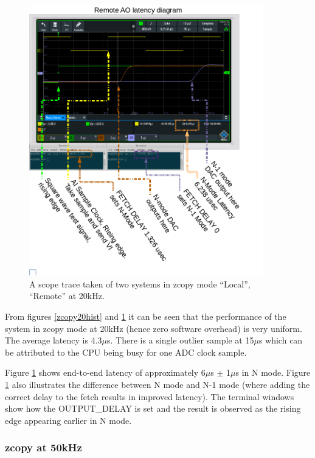 \documentclass{article}
\begin{document}
\begin{figure} [htb!]
	\centering
	\includegraphics[width=4.0in]{images/20kHz_annotated_scope.png}
	\caption{A scope trace taken of two systems in zcopy mode “Local”, “Remote” at 20kHz.}
	\label{zcopy20scope}
\end{figure}

From figures \ref{zcopy20hist} and \ref{zcopy20scope} it can be seen that the performance of the system in zcopy mode at 20kHz (hence zero software overhead) is very uniform.
The average latency is 4.3$\mu$s.
There is a single outlier sample at 15$\mu$s which can be attributed to the CPU being busy for one ADC clock sample.

Figure \ref{zcopy20scope} shows end-to-end latency of approximately 6$\mu$s $\pm$ 1$\mu$s in N mode.
Figure \ref{zcopy20scope} also illustrates the difference between N mode and N-1 mode (where adding the correct delay to the fetch results in improved latency).
The terminal windows show how the OUTPUT\_DELAY is set and the result is observed as the rising edge appearing earlier in N mode.

\subsubsection{zcopy at 50kHz}
\end{document}
